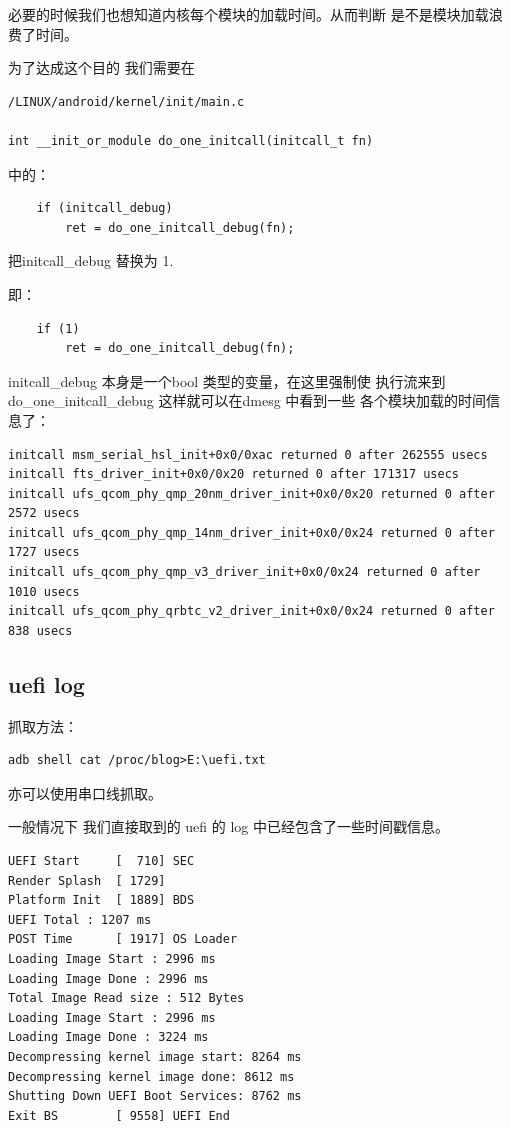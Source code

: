 必要的时候我们也想知道内核每个模块的加载时间。从而判断
是不是模块加载浪费了时间。


为了达成这个目的 我们需要在 
\begin{lstlisting}
/LINUX/android/kernel/init/main.c

int __init_or_module do_one_initcall(initcall_t fn)
\end{lstlisting}
中的：
\begin{lstlisting}
	if (initcall_debug)
		ret = do_one_initcall_debug(fn);
\end{lstlisting}

把initcall\_debug  替换为 1.

即：
\begin{lstlisting}
	if (1)
		ret = do_one_initcall_debug(fn);
\end{lstlisting}

initcall\_debug 本身是一个bool 类型的变量，在这里强制使
执行流来到do\_one\_initcall\_debug 这样就可以在dmesg 中看到一些
各个模块加载的时间信息了：
\begin{lstlisting}
initcall msm_serial_hsl_init+0x0/0xac returned 0 after 262555 usecs
initcall fts_driver_init+0x0/0x20 returned 0 after 171317 usecs
initcall ufs_qcom_phy_qmp_20nm_driver_init+0x0/0x20 returned 0 after 2572 usecs
initcall ufs_qcom_phy_qmp_14nm_driver_init+0x0/0x24 returned 0 after 1727 usecs
initcall ufs_qcom_phy_qmp_v3_driver_init+0x0/0x24 returned 0 after 1010 usecs
initcall ufs_qcom_phy_qrbtc_v2_driver_init+0x0/0x24 returned 0 after 838 usecs
\end{lstlisting}





\subsection{uefi log}
抓取方法：
\begin{lstlisting}
adb shell cat /proc/blog>E:\uefi.txt
\end{lstlisting}
亦可以使用串口线抓取。

一般情况下 我们直接取到的 uefi 的 log 中已经包含了一些时间戳信息。
\begin{lstlisting}
UEFI Start     [  710] SEC
Render Splash  [ 1729]
Platform Init  [ 1889] BDS
UEFI Total : 1207 ms
POST Time      [ 1917] OS Loader
Loading Image Start : 2996 ms
Loading Image Done : 2996 ms
Total Image Read size : 512 Bytes
Loading Image Start : 2996 ms
Loading Image Done : 3224 ms
Decompressing kernel image start: 8264 ms
Decompressing kernel image done: 8612 ms
Shutting Down UEFI Boot Services: 8762 ms
Exit BS        [ 9558] UEFI End
\end{lstlisting}





